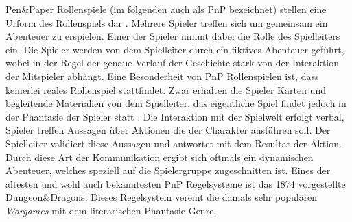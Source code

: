 Pen\&Paper Rollenspiele (im folgenden auch als PnP bezeichnet) stellen eine Urform des Rollenspiels dar \cite{Apperley2006}. Mehrere Spieler treffen sich um gemeinsam ein Abenteuer zu erspielen. Einer der Spieler nimmt dabei die Rolle des Spielleiters ein. Die Spieler werden von dem Spielleiter durch ein fiktives Abenteuer geführt, wobei in der Regel der genaue Verlauf der Geschichte stark von der Interaktion der Mitspieler abhängt. \cite{Apperley2006}\newline 
Eine Besonderheit von PnP Rollenspielen ist, dass keinerlei reales Rollenspiel stattfindet. Zwar erhalten die Spieler Karten und begleitende Materialien von dem Spielleiter, das eigentliche Spiel findet jedoch in der Phantasie der Spieler statt \cite{Copier2005}. Die Interaktion mit der Spielwelt erfolgt verbal, Spieler treffen Aussagen über Aktionen die der Charakter ausführen soll. Der Spielleiter validiert diese Aussagen und antwortet mit dem Resultat der Aktion. Durch diese Art der Kommunikation ergibt sich oftmals ein dynamischen Abenteuer, welches speziell auf die Spielergruppe zugeschnitten ist. \cite{Drachen2008}\newline
Eines der ältesten und wohl auch bekanntesten PnP Regelsysteme ist das 1874 vorgestellte Dungeon\&Dragons. Dieses Regelsystem vereint die damals sehr populären \emph{Wargames} mit dem literarischen Phantasie Genre. \cite{Copier2005}

